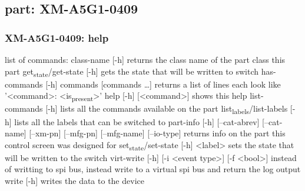 \documentclass[11pt]{article}
\begin{document}
\subsection{part: XM-A5G1-0409}
\label{sec:orgad0a979}
\subsubsection{XM-A5G1-0409: help}
\label{sec:orgb2aa9fe}
list of commands:
  class-name [-h]
    returns the class name of the part class this part
  get\textsubscript{state}/get-state [-h]
    gets the state that will be written to switch
  has-commands [-h] commands [commands \ldots{}]
    returns a list of lines each look like '<command>: <is\textsubscript{present}>'
  help [-h] [<command>]
    shows this help
  list-commands [-h]
    lists all the commands available on the part
  list\textsubscript{labels}/list-labels [-h]
    lists all the labels that can be switched to
  part-info  [-h] [--cat-abrev] [--cat-name] [--xm-pn] [--mfg-pn] [--mfg-name]
          [--io-type]
    returns info on the part this control screen was designed for
  set\textsubscript{state}/set-state [-h] <label>
    sets the state that will be written to the switch
  virt-write [-h] [-i <event type>] [-f <bool>]
    instead of writting to spi bus, instead write to a virtual spi bus
    and return the log output
  write [-h]
    writes the data to the device
\end{document}
